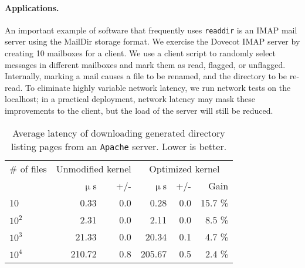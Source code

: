 \paragraph{Applications.}
An important example of software that frequently uses {\tt readdir} is an 
IMAP mail server using the MailDir storage format.
We exercise the Dovecot IMAP server by creating 10 mailboxes for a client.
We use a client script to randomly select messages in different mailboxes and mark them as read, flagged, or unflagged.
Internally, marking a mail causes a file to be renamed, and the directory to be re-read.
To eliminate highly variable network latency, we run network tests on the localhost; 
in a practical deployment, network latency may mask these improvements to the client, but the load of the server will still be reduced.



\begin{table}[t]
\scriptsize
\centering
\begin{tabular}{|l|rr|rrr|}
\hline
\# of files & \multicolumn{2}{c|}{Unmodified kernel} & \multicolumn{3}{c|}{Optimized kernel} \\
& $\upmu$s & +/- & $\upmu$s & +/- & Gain\\
\hline
   10 &    0.33 & 0.0 &   0.28 & 0.0 & 15.7 \% \\
\hline
$10^2$ &   2.31 & 0.0 &   2.11 & 0.0 &  8.5 \% \\
\hline
$10^3$ &  21.33 & 0.0 &  20.34 & 0.1 & 4.7 \% \\
\hline
$10^4$ & 210.72 & 0.8 & 205.67 & 0.5 & 2.4 \% \\
\hline
\end{tabular}
\caption{Average latency of downloading generated directory listing pages from an {\tt Apache} server. Lower is better.}
\label{table:apache}
\end{table}

